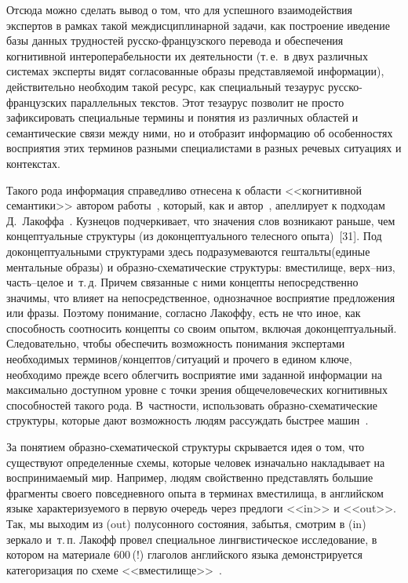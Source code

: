 \begin{multicols}{2}
     Отсюда можно сделать вывод о том, что для успешного 
взаимодействия экспертов в рамках такой междисциплинарной задачи, как 
построение и\linebreak ведение базы данных трудностей рус\-ско-фран\-цуз\-ско\-го 
перевода и обеспечения когнитивной ин\-тер\-опе\-ра\-бель\-ности их деятельности 
(т.\,е.\ в двух различных системах эксперты видят согласованные \mbox{образы} 
представляемой информации), действительно необходим такой ресурс, как 
специальный тезаурус рус\-ско-фран\-цуз\-ских параллельных текстов. Этот 
тезаурус позволит не просто зафиксировать специальные термины и понятия 
из различных областей и семантические связи между ними, но и отобразит 
информацию об особенностях восприятия этих терминов разными 
специалистами в разных речевых ситуациях и контекстах.
     
     Такого рода информация справедливо отнесена к области 
<<когнитивной семантики>> автором работы~\cite{31-ko}, который, как и 
автор~\cite{26-ko}, апеллирует к подходам Д.~Лакоффа~\cite{32-ko}. 
Кузнецов подчеркивает, что значения слов возникают раньше, чем 
концептуальные структуры (из доконцептуального телесного опыта)~[31]. Под 
доконцептуальными структурами здесь подразумеваются гештальты\linebreak (единые 
ментальные образы) и об\-раз\-но-схе\-ма\-ти\-че\-ские структуры: 
вместилище, верх--низ, часть--це\-лое и~т.\,д. Причем связанные с ними 
кон\-цеп\-ты непосредственно значимы, что влияет на непосредствен\-ное, 
однозначное восприятие предложения или фразы. Поэтому понимание, 
согласно Лакоффу, есть не что иное, как способность соотносить концепты 
со своим опытом, включая доконцептуальный. Следовательно, чтобы 
обеспечить возможность понимания экспертами необходимых 
     тер\-ми\-нов/кон\-цеп\-тов/си\-ту\-а\-ций и прочего в едином ключе, 
необходимо прежде всего облегчить восприятие ими заданной информации 
на максимально доступном уровне с точки зрения общечеловеческих 
когнитивных способностей такого рода. В~частности, использовать 
     об\-раз\-но-схе\-ма\-ти\-че\-ские структуры, которые дают возможность 
людям рассуждать быстрее машин~\cite{31-ko}.
     
     За понятием образно-схе\-ма\-ти\-че\-ской струк\-ту\-ры скрывается 
идея о том, что существуют определенные схемы, которые человек 
изначально накладывает на воспринимаемый мир. Например, людям 
свойственно представлять большие фрагменты своего повседневного опыта в 
терминах вместилища, в английском языке характеризуемого в первую 
очередь через предлоги <<in>> и <<out>>. Так, мы выходим из (out) 
полусонного состояния, забытья, смотрим в (in) зеркало и~т.\,п. Лакофф 
провел специальное лингвистическое исследование, в котором на материале 
600\,(!) глаголов английского языка демонстрируется категоризация по схеме 
<<вместилище>>~\cite{33-ko}.
     

\end{multicols}
